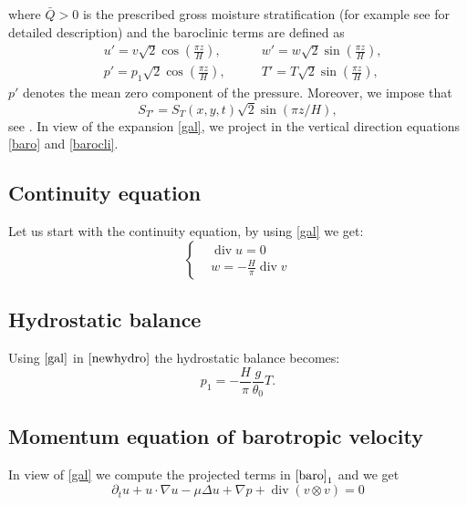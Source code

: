 \documentclass[11pt, a4paper, article,reqno,]{amsart}
\theoremstyle{remark}
\DeclareMathOperator{\dive}{div}
\numberwithin{equation}{section}
\begin{document}
where $\bar{Q}>0$ is the prescribed gross moisture stratification (for example see \cite{LT} for detailed description) and the baroclinic terms are defined as
\begin{equation*}
     \begin{aligned}
        & u'= v\sqrt{2}\cos \left( \frac{\pi z}{H} \right), \qquad & w'= w\sqrt{2}\sin \left( \frac{\pi z}{H} \right), \\
        & p'= p_1\sqrt{2}\cos \left( \frac{\pi z}{H} \right),  \qquad &T'=T\sqrt{2}\sin \left( \frac{\pi z}{H} \right),
    \end{aligned}
\end{equation*}
$p'$ denotes the mean zero component of the pressure. Moreover, we impose that 
$$S_{T'} = S_T(x,y,t) \sqrt{2}\sin (\pi z/H),$$
see \cite{SM}. 
In view of the expansion \eqref{gal}, we project in the vertical direction equations \eqref{baro} and \eqref{barocli}.

\subsection*{Continuity equation}
Let us start with the continuity equation, by using \eqref{gal} we get:
\begin{equation}\label{cont}
    \left\{\begin{aligned}
& \dive u = 0 \\
& w = -\frac{H}{\pi} \dive v 
    \end{aligned}\right.
\end{equation}

\subsection*{Hydrostatic balance}
Using $\eqref{gal}$ in $\eqref{newhydro}$ the hydrostatic balance becomes:
\begin{equation}\label{hydro}
    p_1 = - \frac{H}{\pi} \frac{g}{\theta_0} T.
\end{equation}



\subsection*{Momentum equation of barotropic velocity}
In view of \eqref{gal} we compute the projected terms in $\eqref{baro}_1$ and we get
\begin{equation}\label{barovel}
   \partial_t u + u \cdot \nabla u - \mu \Delta u + \nabla p + \dive (v \otimes v) = 0
   \end{equation}
\end{document}
